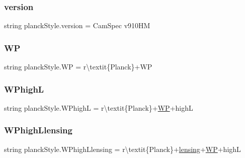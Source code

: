 \mbox{\label{namespaceplanckStyle_a5421450fd31f8abd831555a9bd2e0512}} 
\subsubsection{\texorpdfstring{version}{version}}
{\footnotesize\ttfamily string planck\+Style.\+version = \textquotesingle{}Cam\+Spec v910\+HM\textquotesingle{}}

\mbox{\label{namespaceplanckStyle_a5d775e6f13fd2b985a0b85c7b83669c0}} 
\subsubsection{\texorpdfstring{WP}{WP}}
{\footnotesize\ttfamily string planck\+Style.\+WP = r\textquotesingle{}\textbackslash{}textit\{Planck\}+WP\textquotesingle{}}

\mbox{\label{namespaceplanckStyle_a9a7e223059a3ac02d4011fdbcef4085a}} 
\subsubsection{\texorpdfstring{W\+PhighL}{WPhighL}}
{\footnotesize\ttfamily string planck\+Style.\+W\+PhighL = r\textquotesingle{}\textbackslash{}textit\{Planck\}+\mbox{\hyperlink{namespaceplanckStyle_a5d775e6f13fd2b985a0b85c7b83669c0}{WP}}+highL\textquotesingle{}}

\mbox{\label{namespaceplanckStyle_acf229a727dcf8c928a13781a4d117ad0}} 
\subsubsection{\texorpdfstring{W\+Phigh\+Llensing}{WPhighLlensing}}
{\footnotesize\ttfamily string planck\+Style.\+W\+Phigh\+Llensing = r\textquotesingle{}\textbackslash{}textit\{Planck\}+\mbox{\hyperlink{namespaceplanckStyle_a444ad7b6645bdd1c5221347a4aacb75b}{lensing}}+\mbox{\hyperlink{namespaceplanckStyle_a5d775e6f13fd2b985a0b85c7b83669c0}{WP}}+highL\textquotesingle{}}

